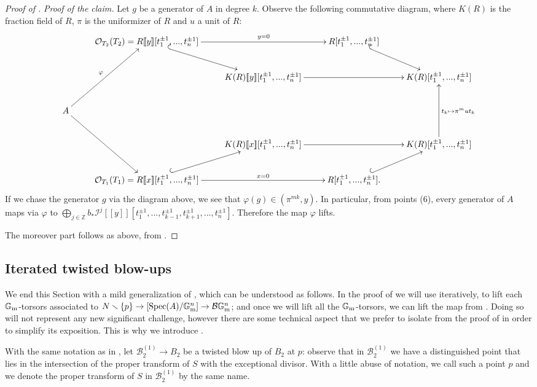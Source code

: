 \documentclass{amsart}
\newcommand{\bG}{\mathbb{G}}
\newcommand{\cB}{\mathcal{B}}
\newcommand{\cI}{\mathcal{I}}
\newcommand{\cO}{\mathcal{O}}
\newcommand{\spec}{\operatorname{Spec}}
\newcommand{\Gm}{\bG_{{\rm m}}}
\theoremstyle{definition}
\begin{document}
\begin{proof}[Proof of ]
\emph{Proof of the claim.}
Let $g$ be a generator of $A$ in degree $k$. Observe the following commutative diagram, where $K(R)$ is the fraction field of $R$, $\pi$ is the uniformizer of $R$ and $u$ a unit of $R$:
$$\xymatrix{ & \cO_{T_2}(T_2) = R[\![y]\!][t_1^{\pm1},...,t_n^{\pm 1}] \ar@{^{(}->}[dr]\ar[rr]^-{y = 0} & & R[t_1^{\pm1},...,t_n^{\pm 1}] \ar@{^{(}->}[dr]& \\
& & K(R)[\![y]\!][t_1^{\pm1},...,t_n^{\pm 1}]\ar[rr] & & K(R)[t_1^{\pm1},...,t_n^{\pm 1}]\\
A\ar[ruu]^-\varphi \ar[rdd] & & & &\\
& & K(R)[\![x]\!][t_1^{\pm1},...,t_n^{\pm 1}]\ar[rr] & & K(R)[t_1^{\pm1},...,t_n^{\pm 1}]\ar[uu]_{t_k\mapsto \pi^m u t_k}\\
& \cO_{T_1}(T_1) = R[\![x]\!][t_1^{\pm1},...,t_n^{\pm 1}] \ar@{^{(}->}[ur]\ar[rr]^-{x = 0} & & R[t_1^{\pm1},...,t_n^{\pm 1}]. \ar@{^{(}->}[ur]& 
}$$
If we chase the generator $g$ via the diagram above, we see that $\varphi(g)\in (\pi^{mk},y)$. In particular, from  points (6), every generator of $A$ maps via $\varphi$ to $\bigoplus_{j\in \mathbb{Z}}b_*\cI^j[\![y]\!][t_1^{\pm1},...,t_{k-1}^{\pm1},t_{k+1}^{\pm 1},...,t_n^{\pm 1}]$. Therefore the map $\varphi$ lifts.

The moreover part follows as above, from .
\end{proof}
\subsection{Iterated twisted blow-ups} 
 We end this Section with a mild generalization of , which can be understood as follows. In the proof of  we will use  iteratively, to lift each $\Gm$-torsors associated to $N\smallsetminus\{p\}\to[\spec(A)/\Gm^n]\to \cB\Gm^n$; and once we will lift all the $\Gm$-torsors, we can lift the map from . Doing so will not represent any new significant challenge, however there are some technical aspect that we prefer to isolate from the proof of  in order to simplify its exposition. This is why we introduce .
 
 
 With the same notation as in , let $\cB_2^{(1)}\to B_2$ be a twisted blow up of $B_2$ at $p$: observe that in $\cB_2^{(1)}$ we have a distinguished point that lies in the intersection of the proper transform of $S$ with the exceptional divisor. With a little abuse of notation, we call such a point $p$ and we denote the proper transform of $S$ in $\cB_2^{(1)}$ by the same name.
\end{document}

